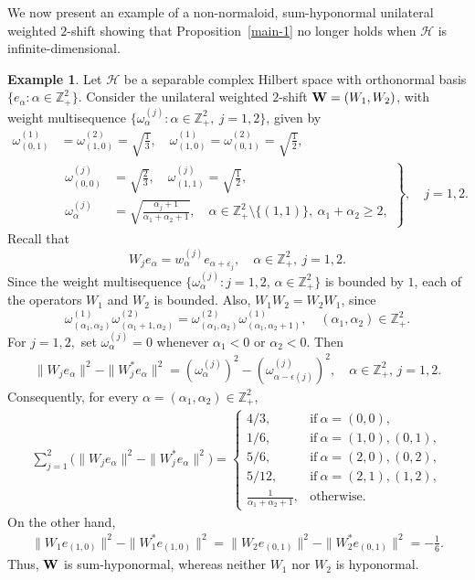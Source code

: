 \documentclass[10pt, a4paper, oneside, reqno]{amsproc}
\numberwithin{equation}{section}
\theoremstyle{remark}
\theoremstyle{definition}
\newtheorem{example}[theorem]{Example}
\newcommand*{\Ge}{\geqslant}
\begin{document}
We now present an example of a non-normaloid, sum-hyponormal unilateral weighted $2$-shift showing that Proposition~\ref{main-1} no longer holds when $\mathcal H$ is infinite-dimensional.
\begin{example} \label{q-hypo} 
Let $\mathcal H$ be a separable complex Hilbert space with orthonormal basis 
$\{e_\alpha : \alpha \in \mathbb Z^2_+\}$. Consider the unilateral weighted $2$-shift ${\bf W}=(W_1, W_2)$, with weight multisequence $\big\{\omega^{(j)}_{\alpha} : \alpha \in \mathbb Z^2_+, ~j=1, 2\big\}$, given by 
\begin{align*}
\omega^{(1)}_{(0,1)}
&=\omega^{(2)}_{(1,0)}=\sqrt{\frac{1}{3}}, \quad
\omega^{(1)}_{(1,0)}
=\omega^{(2)}_{(0,1)}=\sqrt{\frac{1}{2}},\\
&\left.
\begin{aligned}
\omega^{(j)}_{(0,0)}
&=\sqrt{\frac{2}{3}}, \quad
\omega^{(j)}_{(1,1)}
=\sqrt{\frac{1}{2}},\\
\omega^{(j)}_{\alpha}
&=\sqrt{\frac{\alpha_j+1}{\alpha_1+\alpha_2+1}},
\quad
\alpha\in\mathbb Z_+^2\setminus\{(1,1)\},\ \alpha_1+\alpha_2 \Ge 2,
\end{aligned}
\right\},
\quad j=1,2.
\end{align*}
Recall that 
\begin{equation*}
W_j e_\alpha = w^{(j)}_\alpha e_{\alpha + \varepsilon_j}, \quad \alpha \in \mathbb Z^2_+, ~j=1, 2.
\end{equation*}
Since the weight multisequence
$\big\{{\omega^{(j)}_\alpha} : j
=1, 2, \,\alpha \in  \mathbb Z^2_+ \big\}$ is bounded by $1$, each of the operators $W_1$ and $W_2$ is bounded.
Also, $W_1W_2=W_2W_1$, since $$\omega^{(1)}_{(\alpha_1, \alpha_2)}\omega^{(2)}_{(\alpha_1+1, \alpha_2)}=\omega^{(2)}_{(\alpha_1, \alpha_2)}\omega^{(1)}_{(\alpha_1, \alpha_2+1)}, \quad (\alpha_1, \alpha_2) \in \mathbb Z^2_+.$$ 
For $j=1, 2,$ set $\omega^{(j)}_{\alpha}=0$ whenever $\alpha_1 < 0$ or $\alpha_2 < 0$. Then
\begin{align*}
\|W_je_\alpha\|^2- \|W^*_je_\alpha\|^2=(\omega^{(j)}_\alpha)^2- (\omega^{(j)}_{\alpha- \epsilon(j)})^2, \quad  \alpha \in \mathbb Z^2_+,\, j=1, 2.
\end{align*}  
Consequently, for every $\alpha = (\alpha_1, \alpha_2) \in\mathbb Z^2_+$, 
\begin{align*}
\sum_{j=1}^2 \Big(\|W_je_\alpha\|^2- \|W^*_je_\alpha\|^2\Big)
=\begin{cases} 4/3, & \mbox{if}~\alpha=(0, 0),\\
1/6, & \mbox{if}~\alpha=(1, 0), (0, 1), \\
5/6, & \mbox{if}~\alpha=(2, 0), (0, 2),\\
5/12, & \mbox{if}~\alpha=(2, 1), (1, 2),\\
\frac{1}{\alpha_1+\alpha_2+1}, & \mbox{otherwise}.
\end{cases}
\end{align*}
On the other hand, 
\begin{align*}
\|W_1e_{(1, 0)}\|^2- \|W^*_1e_{(1, 0)}\|^2=
\|W_2e_{(0, 1)}\|^2- \|W^*_2e_{(0, 1)}\|^2 =-\frac{1}{6}.
\end{align*}
Thus, ${\bf W}$ is sum-hyponormal, whereas neither $W_1$ nor $W_2$ is hyponormal.


\end{example}
\end{document}
